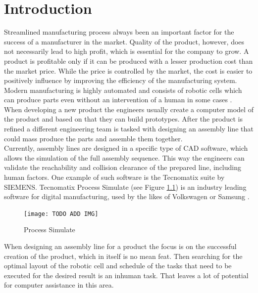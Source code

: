 \chapter{Introduction}
\label{ch:introduction}
\graphicspath{ {chapters/Introduction/} }

Streamlined manufacturing process always been an important factor for the success of a manufacturer in the market. 
Quality of the product, however, does not necessarily lead to high profit, which is essential for the company to grow. 
A product is profitable only if it can be produced with a lesser production cost than the market price. 
While the price is controlled by the market, the cost is easier to positively influence by improving the efficiency of the manufacturing system. 
Modern manufacturing is highly automated and consists of robotic cells which can produce parts even without an intervention of a human in some cases \cite{VirtualCommisioning}. \\

When developing a new product the engineers usually create a computer model of the product and based on that they can build prototypes. After the product is refined a different engineering team is tasked with designing an assembly line that could mass produce the parts and assemble them together. \\
 
Currently, assembly lines are designed in a specific type of CAD software, which allows the simulation of the full assembly sequence.
This way the engineers can validate the reachability and collision clearance of the prepared line, including human factors.
One example of such software is the Tecnomatix suite by SIEMENS. Tecnomatix Process Simulate (see Figure \ref{fig:ProcessSimulate}) is an industry leading software for digital manufacturing, used by the likes of Volkswagen or Samsung \cite{TecnomatixCustomers}. \\ 

\begin{figure}[ht]
	\caption{Process Simulate}
	\centering
	  \texttt{[image: TODO ADD IMG]}
	\label{fig:ProcessSimulate}
\end{figure}

When designing an assembly line for a product the focus is on the successful creation of the product, which in itself is no mean feat. 
Then searching for the optimal layout of the robotic cell and schedule of the tasks that need to be executed for the desired result is an inhuman task. That leaves a lot of potential for computer assistance in this area. \\ 

